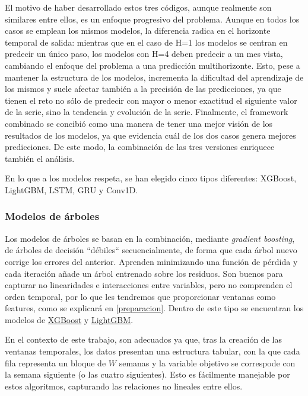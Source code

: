 \documentclass[a4paper,onecolumn]{extarticle}
\begin{document}
\begin{sloppypar}
El motivo de haber desarrollado estos tres códigos, aunque realmente son similares entre ellos, es un enfoque progresivo del problema. Aunque en todos los casos se emplean 
los mismos modelos, la diferencia radica en el horizonte temporal de salida: mientras que en el caso de H=1 los modelos se centran en predecir un único paso, los modelos con 
H=4 deben predecir a un mes vista, cambiando el enfoque del problema a una predicción multihorizonte. Esto, pese a mantener la estructura de los modelos, incrementa la 
dificultad del aprendizaje de los mismos y suele afectar también a la precisión de las predicciones, ya que tienen el reto no sólo de predecir con mayor o menor exactitud 
el siguiente valor de la serie, sino la tendencia y evolución de la serie. Finalmente, el framework combinado se concibió como una manera de tener una mejor visión de los 
resultados de los modelos, ya que evidencia cuál de los dos casos genera mejores predicciones. De este modo, la combinación de las tres versiones enriquece también el análisis.

En lo que a los modelos respeta, se han elegido cinco tipos diferentes: XGBoost, LightGBM, LSTM, GRU y Conv1D.

\subsubsection{Modelos de árboles} \label{modelos}
Los modelos de árboles se basan en la combinación, mediante \textit{gradient boosting}, de árboles de decisión ``débiles`` secuencialmente, de forma que cada árbol nuevo 
corrige los errores del anterior. Aprenden minimizando una función de pérdida y cada iteración añade un árbol entrenado sobre los residuos. Son buenos para capturar no linearidades
e interacciones entre variables, pero no comprenden el orden temporal, por lo que les tendremos que proporcionar ventanas como features, como se explicará en \ref{preparacion}.
Dentro de este tipo se encuentran los modelos de \hyperref[XGB]{XGBoost} y \hyperref[LGBM]{LightGBM}.

En el contexto de este trabajo, son adecuados ya que, tras la creación de las ventanas temporales, los datos presentan una estructura tabular, con la que cada fila representa un 
bloque de $W$ semanas y la variable objetivo se correspode con la semana siguiente (o las cuatro siguientes). Esto es fácilmente manejable por estos algoritmos, capturando 
las relaciones no lineales entre ellos.


\end{sloppypar}
\end{document}
